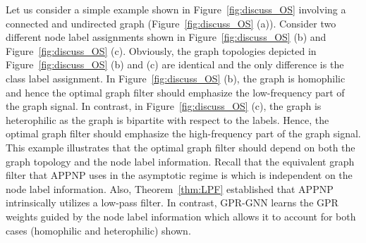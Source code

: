 \documentclass{article} \usepackage{iclr2021_conference,times}
\begin{document}
\begin{figure*}[ht]
  \centering
  \vspace{-0.2cm}
  \caption{A simple example demonstrating how GPR-GNN escapes over-smoothing.}\label{fig:discuss_OS}
\end{figure*}

Let us consider a simple example shown in Figure~\ref{fig:discuss_OS} involving a connected and undirected graph  (Figure~\ref{fig:discuss_OS} (a)). Consider two different node label assignments shown in Figure~\ref{fig:discuss_OS} (b) and Figure~\ref{fig:discuss_OS} (c). Obviously, the graph topologies depicted in Figure~\ref{fig:discuss_OS} (b) and (c) are identical and the only difference is the class label assignment. In Figure~\ref{fig:discuss_OS} (b), the graph is homophilic and hence the optimal graph filter should emphasize the low-frequency part of the graph signal. In contrast, in Figure~\ref{fig:discuss_OS} (c), the graph is heterophilic as the graph is bipartite with respect to the labels. Hence, the optimal graph filter should emphasize the high-frequency part of the graph signal. This example illustrates that the optimal graph filter should depend on
both the graph topology and the node label information. Recall that the equivalent graph filter that APPNP uses in the asymptotic regime is  which is independent on the node label information. Also, Theorem~\ref{thm:LPF} established that APPNP intrinsically utilizes a low-pass filter. In contrast, GPR-GNN learns the GPR weights guided by the node label information which allows it to account for both
cases (homophilic and heterophilic) shown.
\end{document}
